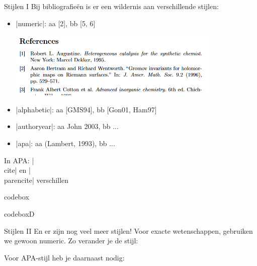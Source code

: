 
\begin{frame}{Stijlen I}
	Bij bibliografie\"en is er een wildernis aan verschillende stijlen:
	
	\begin{itemize}
		\item \hll|numeric|: aa [2], bb [5, 6]\par
		\includegraphics[width=0.8\textwidth]{assets/6_Bibliografie/biblatexStyles/numericReferences.png}
		
		\item\hll|alphabetic|: aa [GMS94], bb [Gon01, Ham97]
		\item\hll|authoryear|: aa John 2003, bb ...
		\item\hll|apa|: aa (Lambert, 1993), bb ...
	\end{itemize}
	In APA: \hll|\\cite| en \hll|\\parencite| verschillen
\end{frame}


\begin{saveblock}{codebox}
	\begin{highlightblock}
		\usepackage[style=numeric]{biblatex}
	\end{highlightblock}
\end{saveblock}


\begin{saveblock}{codeboxD}%
	\begin{highlightblock}
	\end{highlightblock}
\end{saveblock}

\begin{frame}{Stijlen II}
	En er zijn nog veel meer stijlen! Voor exacte wetenschappen, gebruiken we gewoon numeric. Zo
	verander je de stijl:
	
	\medskip
	Voor APA-stijl heb je daarnaast nodig:
\end{frame}
